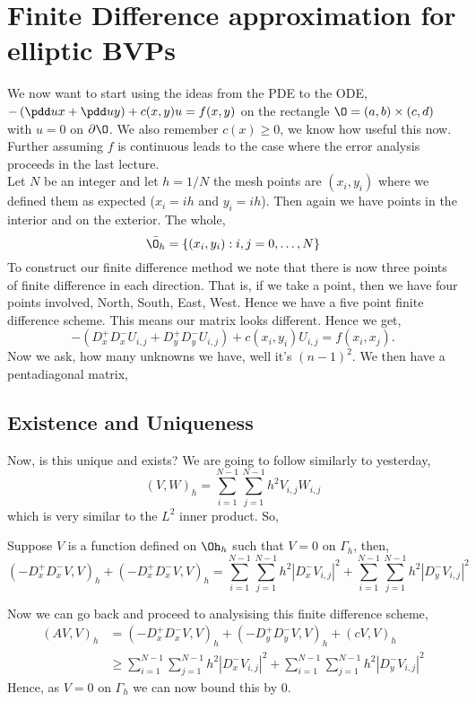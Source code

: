 
\section{Finite Difference approximation for elliptic BVPs}

\noindent
We now want to start using the ideas from the PDE to the ODE, $-\left( \pdd u x + \pdd u y \right) + c(x, y)u = f(x, y)$ on the rectangle $\O = (a, b) \times (c, d)$ with $u = 0$ on $\partial \O$. We also remember $c(x) \ge 0$, we know how useful this now. Further assuming $f$ is continuous leads to the case where the error analysis proceeds in the last lecture.\\

\noindent
Let $N$ be an integer and let $h = 1/N$ the mesh points are $(x_i, y_i)$ where we defined them as expected ($x_i = ih$ and $y_i = ih$). Then again we have points in the interior and on the exterior. The whole,
$$ \bar{\O_h} = \{(x_i, y_i) : i, j = 0, \dots, N\} $$
To construct our finite difference method we note that there is now three points of finite difference in each direction. That is, if we take a point, then we have four points involved, North, South, East, West. Hence we have a five point finite difference scheme. This means our matrix looks different. Hence we get,
$$ -(D_x^+D_x^- U_{i,j} + D_y^+D_y^-U_{i,j}) + c(x_i, y_i)U_{i,j} = f(x_i, x_j). $$
Now we ask, how many unknowns we have, well it's $(n - 1)^2$. We then have a pentadiagonal matrix,

\subsection{Existence and Uniqueness}

Now, is this unique and exists? We are going to follow similarly to yesterday,
$$ (V, W)_h = \sum_{i=1}^{N-1}\sum_{j=1}^{N-1} h^2 V_{i, j}W_{i, j} $$
which is very similar to the $L^2$ inner product. So,
\begin{nlemma}
  Suppose $V$ is a function defined on $\Oh_h$ such that $V = 0$ on $\Gamma_h$, then,
  $$ (-D_x^+D_x^- V, V)_h + (-D_x^+D_x^- V, V)_h = \sum_{i=1}^{N-1}\sum_{j=1}^{N-1} h^2|D_x^- V_{i,j}|^2 + \sum_{i=1}^{N-1}\sum_{j=1}^{N-1} h^2 |D_y^-V_{i,j}|^2 $$
\end{nlemma}

Now we can go back and proceed to analysising this finite difference scheme,
\begin{align*}
  (AV, V)_h &= (-D_x^+D_x^- V, V)_h + (-D_y^+D_y^- V, V)_h + (cV, V)_h \\
  &\ge\sum_{i=1}^{N-1}\sum_{j=1}^{N-1} h^2|D_x^- V_{i,j}|^2 + \sum_{i=1}^{N-1}\sum_{j=1}^{N-1} h^2 |D_y^-V_{i,j}|^2
\end{align*}
Hence, as $V = 0$ on $\Gamma_h$ we can now bound this by $0$.

